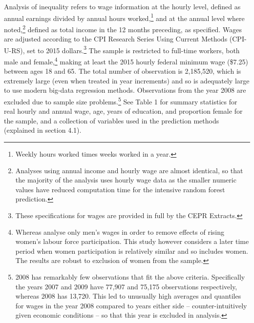 \documentclass[notitlepage,12pt]{article}
\begin{document}
Analysis of inequality refers to wage information at the hourly level, defined as annual earnings divided by annual hours worked,\footnote{Weekly hours worked times weeks worked in a year.} and at the annual level where noted,\footnote{Analyses using annual income and hourly wage are almost identical, so that the majority of the analysis uses hourly wage data as the smaller numeric values have reduced computation time for the intensive random forest prediction.} defined as total income in the 12 months preceding, as specified.  Wages are adjusted according to the CPI Research Series Using Current Methods (CPI-U-RS), set to 2015 dollars.\footnote{These specifications for wages are provided in full by the CEPR Extracts.}  The sample is restricted to full-time workers, both male and female,\footnote{Whereas \cite{juhn1993wage} analyse only men's wages in order to remove effects of rising women's labour force participation.  This study however considers a later time period when women participation is relatively similar and so includes women.  The results are robust to exclusion of women from the sample.} making at least the 2015 hourly federal minimum wage (\$7.25) between ages 18 and 65.  The total number of observation is 2,185,520, which is extremely large (even when treated in year increments) and so is adequately large to use modern big-data regression methods.\nocite{varian2014big}  Observations from the year 2008 are excluded due to sample size problems.\footnote{2008 has remarkably few observations that fit the above criteria.  Specifically the years 2007 and 2009 have 77,907 and 75,175 observations respectively, whereas 2008 has 13,720.  This led to unusually high averages and quantiles for wages in the year 2008 compared to years either side -- counter-intuitively given economic conditions -- so that this year is excluded in analysis.}  See Table 1 for summary statistics for real hourly and annual wage, age, years of education, and proportion female for the sample, and a collection of variables used in the prediction methods (explained in section 4.1).
\end{document}
